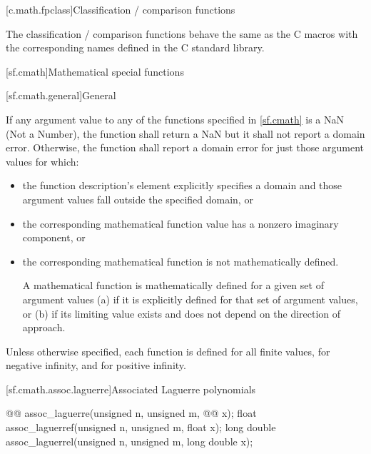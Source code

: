 [c.math.fpclass]{Classification / comparison functions}

\pnum
The classification / comparison functions behave the same as the C macros with the
corresponding names defined in the C standard library.


[sf.cmath]{Mathematical special functions}%

[sf.cmath.general]{General}%
%

\pnum
{}%
If any argument value
to any of the functions specified in \ref{sf.cmath}
is a NaN (Not a Number),
the function shall return a NaN
but it shall not report a domain error.
Otherwise,
the function shall report a domain error
for just those argument values
for which:
\begin{itemize}
  \item
  the function description's \returns element
  explicitly specifies a domain
  and those argument values fall
  outside the specified domain,
  or

  \item
  the corresponding mathematical function value
  has a nonzero imaginary component,
  or

  \item
  the corresponding mathematical function
  is not mathematically defined.
\begin{footnote}
    A mathematical function
    is mathematically defined
    for a given set of argument values
    (a)
      if it is explicitly defined
      for that set of argument values,
      or
    (b)
      if its limiting value exists
      and does not depend
      on the direction of approach.
\end{footnote}
\end{itemize}

\pnum
Unless otherwise specified,
each function is defined
for all finite values,
for negative infinity,
and for positive infinity.

[sf.cmath.assoc.laguerre]{Associated Laguerre polynomials}%
%
%
%
%
%
\begin{itemdecl}
@@ assoc_laguerre(unsigned n, unsigned m, @@ x);
float        assoc_laguerref(unsigned n, unsigned m, float x);
long double  assoc_laguerrel(unsigned n, unsigned m, long double x);
\end{itemdecl}

